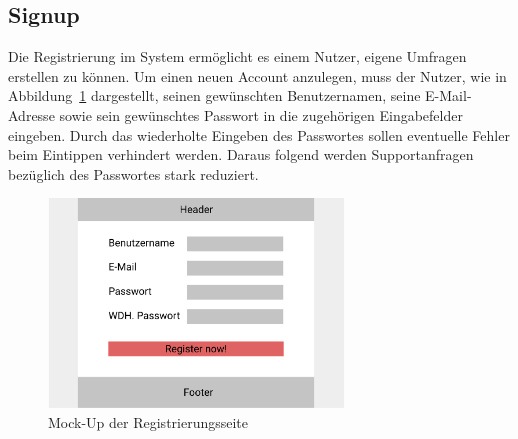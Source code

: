 \subsection{Signup}
\label{ssec:konzept:client:signup}
Die Registrierung im System ermöglicht es einem Nutzer, eigene Umfragen erstellen zu können.
Um einen neuen Account anzulegen, muss der Nutzer, wie in Abbildung~\ref{fig:MockSignup} dargestellt, seinen gewünschten Benutzernamen, seine E-Mail-Adresse sowie sein gewünschtes Passwort in die zugehörigen Eingabefelder eingeben.
Durch das wiederholte Eingeben des Passwortes sollen eventuelle Fehler beim Eintippen verhindert werden.
Daraus folgend werden Supportanfragen bezüglich des Passwortes stark reduziert.

\begin{figure}[H]
	\centering
	\includegraphics[width=0.7\textwidth]{img/konzeption/client/register}
	\captionsetup{justification=centering, format=plain}
	\caption[Mock-Up der Registrierungsseite]{Mock-Up der Registrierungsseite \\\figma}
	\label{fig:MockSignup}
\end{figure}
